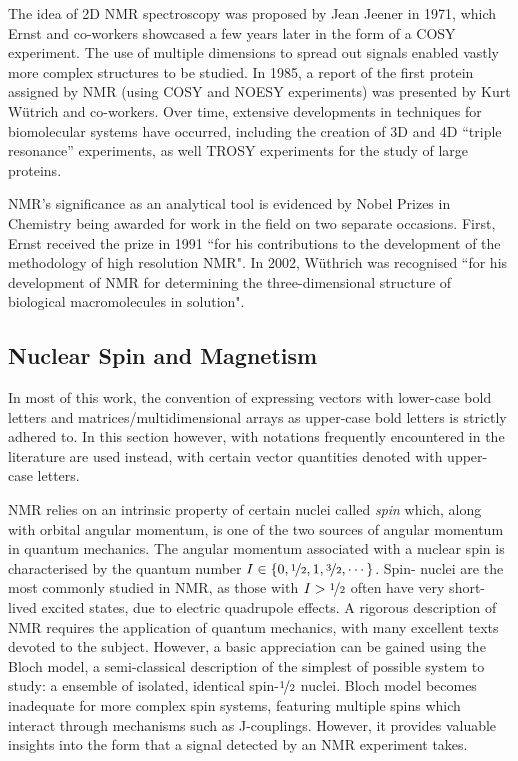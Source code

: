 The idea of 2D NMR spectroscopy was proposed by Jean Jeener in
1971\cite{Jeener1971, Jeener2016}, which Ernst and co-workers showcased a few
years later in the form of a \acs{COSY} experiment\cite{Aue1976a}. The use of
multiple dimensions to spread out signals enabled vastly more complex
structures to be studied. In 1985, a report of the first protein assigned by
\ac{NMR} (using \acs{COSY} and \acs{NOESY} experiments) was presented by Kurt
W\"utrich and co-workers\cite{Williamson1985}. Over time, extensive
developments in techniques for biomolecular systems have occurred, including
the creation of 3D and 4D ``triple resonance'' experiments\cite{Marion1989,
Kay1990}, as well \acs{TROSY} experiments\cite{Pervushin1997} for the study of
large proteins.

\ac{NMR}'s significance as an analytical tool is evidenced by Nobel Prizes in
Chemistry being awarded for work in the field on two separate occasions. First,
Ernst received the prize in 1991 ``for his contributions to the development of
the methodology of high resolution \acl{NMR}"\cite{Ernst1992}. In 2002,
W\"uthrich was recognised ``for his development of \acl{NMR} for determining
the three-dimensional structure of biological macromolecules in
solution"\cite{Wuthrich2003}.

\subsection{Nuclear Spin and Magnetism}
\begin{remark}
    In most of this work, the convention of expressing vectors with lower-case
    bold letters and matrices/multidimensional arrays as upper-case bold
    letters is strictly adhered to. In this section however, with notations
    frequently encountered in the literature are used instead, with certain
    vector quantities denoted with upper-case letters.
\end{remark}

\ac{NMR} relies on an intrinsic property of certain nuclei called \textit{spin}
which, along with orbital angular momentum, is one of the two sources of
angular momentum in quantum mechanics.
The angular momentum associated with a nuclear spin is characterised by the
quantum number $I \in \lbrace 0, \nicefrac{1}{2}, 1, \nicefrac{3}{2}, \cdots
\rbrace$. Spin-
nuclei are the most commonly studied in \ac{NMR}, as those with $I >
\nicefrac{1}{2}$ often have very short-lived excited states, due to electric
quadrupole effects. A rigorous description of \ac{NMR} requires the application
of quantum mechanics, with many excellent texts devoted to the
subject\cite{Abragam1961,Goldman1988,Cavanagh2007}. However, a basic
appreciation can be gained using the Bloch model, a semi-classical description
of the simplest of possible system to study: a ensemble of isolated, identical
spin-$\nicefrac{1}{2}$ nuclei.
Bloch model becomes inadequate for more complex spin systems, featuring
multiple spins which interact through mechanisms such as J-couplings. However,
it provides valuable insights into the form that a signal detected by an
\ac{NMR} experiment takes.

